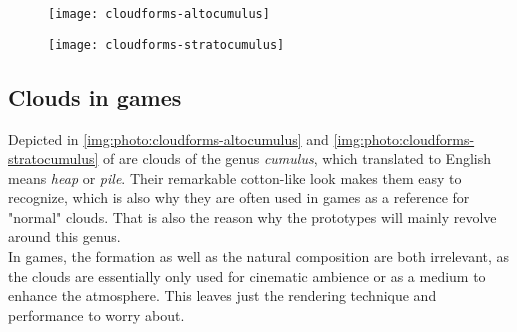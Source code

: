 \begin{figure}[ht]
    \centering
        \begin{minipage}{0.47\linewidth}
            \texttt{[image: cloudforms-altocumulus]}
            \label{img:photo:cloudforms-altocumulus}        
        \end{minipage}        
    \hfill
        \begin{minipage}{0.47\linewidth}
            \texttt{[image: cloudforms-stratocumulus]}
            \label{img:photo:cloudforms-stratocumulus}        
        \end{minipage}  
\end{figure}

\subsection{Clouds in games}
\label{section:clouds-in-games}
Depicted in \autoref{img:photo:cloudforms-altocumulus} and \autoref{img:photo:cloudforms-stratocumulus} of  are clouds of the genus \textit{cumulus}, which translated to English means \textit{heap} or \textit{pile}.
Their remarkable cotton-like look makes them easy to recognize, which is also why they are often used in games as a reference for "normal" clouds. 
That is also the reason why the prototypes will mainly revolve around this genus.
\\
In games, the formation as well as the natural composition are both irrelevant, as the clouds are essentially only used for cinematic ambience or as a medium to enhance the atmosphere. This leaves just the rendering technique and performance to worry about.


